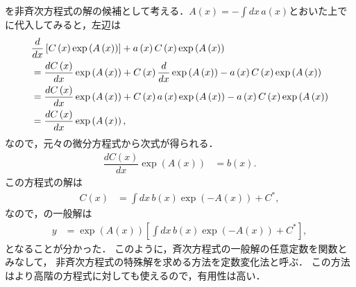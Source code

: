 を非斉次方程式の解の候補として考える．$A\left(x\right) = -\int dx\,a\left(x\right)$とおいた上でに代入してみると，左辺は
\begin{align}
 & \dfrac{d}{dx}\left[C\left(x\right)\exp\left(A\left(x\right)\right)\right]+a\left(x\right)C\left(x\right)\exp\left(A\left(x\right)\right)\notag\\
 & =\dfrac{dC\left(x\right)}{dx}\exp\left(A\left(x\right)\right)+C\left(x\right)\dfrac{d}{dx}\exp\left(A\left(x\right)\right)-a\left(x\right)C\left(x\right)\exp\left(A\left(x\right)\right)\notag\\
 & =\dfrac{dC\left(x\right)}{dx}\exp\left(A\left(x\right)\right)+C\left(x\right)a\left(x\right)\exp\left(A\left(x\right)\right)-a\left(x\right)C\left(x\right)\exp\left(A\left(x\right)\right)\notag\\
 & =\dfrac{dC\left(x\right)}{dx}\exp\left(A\left(x\right)\right),
\end{align}
なので，元々の微分方程式から次式が得られる．
\begin{align}
 \dfrac{dC\left(x\right)}{dx}\exp\left(A\left(x\right)\right) & =b\left(x\right).
\end{align}
この方程式の解は
\begin{align}
 C\left(x\right) & =\int dx\,b\left(x\right)\exp\left(-A\left(x\right)\right)+C^*,
\end{align}
なので，の一般解は
\begin{align}
 y & =\exp\left(A\left(x\right)\right)\left[\int dx\,b\left(x\right)\exp\left(-A\left(x\right)\right)+C^*\right],
\end{align}
となることが分かった．
このように，斉次方程式の一般解の任意定数を関数とみなして，
非斉次方程式の特殊解を求める方法を定数変化法と呼ぶ．
この方法はより高階の方程式に対しても使えるので，有用性は高い．

